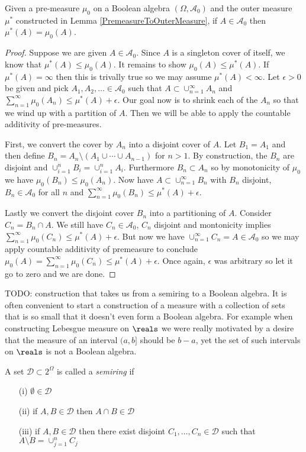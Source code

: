 \begin{lem}\label{PremeasureOuterMeasureEqual}Given a pre-measure $\mu_0$ on a Boolean algebra $(\Omega,
  \mathcal{A}_0)$ and the outer measure $\mu^*$ constructed in Lemma
  \ref{PremeasureToOuterMeasure}, if $A \in \mathcal{A}_0$ then $\mu^*(A)=\mu_0(A)$.
\end{lem}
\begin{proof}
Suppose we are given $A \in \mathcal{A}_0$.  Since $A$ is a singleton
cover of itself, we know that $\mu^*(A) \leq \mu_0(A)$.  It remains to
show $\mu_0(A) \leq \mu^*(A)$.  If $\mu^*(A) =\infty$ then this is
trivally true so we may assume $\mu^*(A) < \infty$.  Let $\epsilon
>0$ be given and pick $A_1, A_2, \dotsc \in \mathcal{A}_0$ such that
$A \subset \cup_{n=1}^\infty A_n$ and 
$\sum_{n=1}^\infty \mu_0(A_n) \leq \mu^*(A) + \epsilon$.  Our goal now
is to shrink each of the $A_n$ so that we wind up with a partition of
$A$.  Then we will be able to apply the countable additivity of pre-measures.

First, we convert the cover by $A_n$ into a disjoint cover of $A$.  Let
$B_1 = A_1$ and then define $B_n = A_n \setminus (A_1 \cup \cdots \cup
A_{n-1})$ for $n>1$.
By construction, the $B_n$ are disjoint and $\cup_{i=1}^n B_i =
\cup_{i=1}^n A_i$.  Furthermore $B_n \subset A_n$ so by monotonicity
of $\mu_0$ we have $\mu_0(B_n) \leq \mu_0(A_n)$.  Now have $A \subset
\cup_{n=1}^\infty B_n$ with $B_n$ disjoint, $B_n \in \mathcal{A}_0$
for all $n$  and $\sum_{n=1}^\infty
\mu_0(B_n) \leq \mu^*(A) + \epsilon$.  

Lastly we convert the disjoint cover $B_n$ into a partitioning of $A$.  
Consider $C_n = B_n \cap A$.  We still have $C_n \in
\mathcal{A}_0$, $C_n$ disjoint and montonicity implies $\sum_{n=1}^\infty
\mu_0(C_n) \leq \mu^*(A) + \epsilon$.  But now we have
$\cup_{n=1}^\infty C_n = A \in \mathcal{A}_0$ so we may apply
countable additivity of premeasure to conclude $\mu_0(A) = \sum_{n=1}^\infty
\mu_0(C_n) \leq \mu^*(A) + \epsilon$.  Once again, $\epsilon$ was
arbitrary so let it go to zero and we are done.
\end{proof}


TODO: construction that takes us from a semiring to a Boolean algebra.
It is often convenient to start a construction of a measure with a
collection of sets that is so small that it doesn't even form a
Boolean algebra.  For example when constructing Lebesgue measure on
$\reals$ we were really motivated by a desire that the measure of an
interval $(a,b]$ should be $b-a$, yet the set of such intervals on
$\reals$ is not a Boolean algebra.
\begin{defn}A set $\mathcal{D} \subset 2^\Omega$ is called a
  \emph{semiring} if 
\begin{itemize}
\item[(i)]$\emptyset \in \mathcal{D}$
\item[(ii)]if $A, B \in \mathcal{D}$ then $A \cap B \in \mathcal{D}$
\item[(iii)]if $A, B \in \mathcal{D}$ then there exist disjoint $C_1,
  \dotsc, C_n \in \mathcal{D}$ such that $A \setminus B = \cup_{j=1}^n
  C_j$
\end{itemize}
\end{defn}

